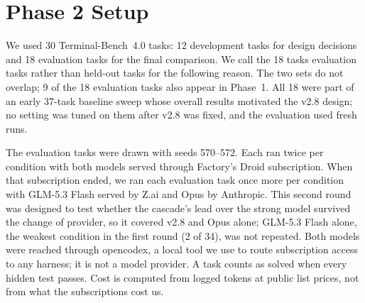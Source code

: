 \section{Phase 2 Setup}
\label{sec:p2setup}

We used 30 Terminal-Bench~4.0 tasks: 12 development tasks for design decisions and 18 evaluation tasks for the
final comparison. We call the 18 tasks evaluation tasks rather than held-out tasks for the following reason. The two sets do not overlap; 9 of the 18 evaluation tasks also appear in Phase~1. All 18 were
part of an early 37-task baseline sweep whose overall results motivated the v2.8 design; no setting was tuned on
them after v2.8 was fixed, and the evaluation used fresh runs.

The evaluation tasks were drawn with seeds 570--572. Each ran twice per condition with both models served through Factory's Droid
subscription. When that subscription ended, we ran each evaluation task once more per condition with GLM-5.3
Flash served by Z.ai and Opus by Anthropic. This second round was designed to test whether the cascade's lead over
the strong model survived the change of provider, so it covered v2.8 and Opus alone; GLM-5.3 Flash alone, the
weakest condition in the first round (2 of 34), was not repeated. Both models were reached through opencodex, a local tool we use to route
subscription access to any harness; it is not a model provider. A task counts as solved when every hidden test
passes. Cost is computed from logged tokens at public list prices, not from what the subscriptions cost us.
